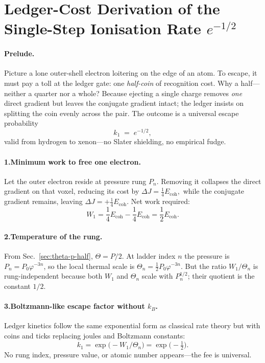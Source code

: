\documentclass[11pt,oneside]{book}
\begin{document}
\section{Ledger-Cost Derivation of the Single-Step Ionisation Rate \texorpdfstring{$e^{-1/2}$}{e^{-1/2}}}
\label{ssec:single-step-rate}

\paragraph*{Prelude.}
Picture a lone outer-shell electron loitering on the edge of an atom.  
To escape, it must pay a toll at the ledger gate: one \emph{half-coin} of recognition cost.  
Why a half—neither a quarter nor a whole?  
Because ejecting a single charge removes \emph{one} direct gradient but leaves the conjugate gradient intact; the ledger insists on splitting the coin evenly across the pair.  
The outcome is a universal escape probability
\[
  k_{1}
  \;=\;
  e^{-1/2},
\]
valid from hydrogen to xenon—no Slater shielding, no empirical fudge.

\paragraph*{1.\;Minimum work to free one electron.}
Let the outer electron reside at pressure rung $P_{n}$.  
Removing it collapses the direct gradient on that voxel, reducing its cost by
\(
  \Delta J = \frac14E_{\text{coh}},
\)
while the conjugate gradient remains, leaving
\(
  \Delta J = +\frac14E_{\text{coh}}.
\)
Net work required:
\[
  W_{1}
  = \frac14E_{\text{coh}} - 
    \frac14E_{\text{coh}}
  = \frac12E_{\text{coh}}.
\]

\paragraph*{2.\;Temperature of the rung.}
From Sec.~\ref{sec:theta-p-half},
\(
  \Theta = P/2.
\)
At ladder index $n$ the pressure is
\(P_{n}=P_{0}\varphi^{-3n}\),  
so the local thermal scale is
\(
  \Theta_{n} = \tfrac12P_{0}\varphi^{-3n}.
\)
But the ratio $W_{1}/\Theta_{n}$ is rung-independent because both $W_{1}$ and $\Theta_{n}$ scale with $P_{n}^{1/2}$; their quotient is the constant $1/2$.

\paragraph*{3.\;Boltzmann-like escape factor without $k_{B}$.}
Ledger kinetics follow the same exponential form as classical rate theory but with coins and ticks replacing joules and Boltzmann constants:
\[
  k_{1}
  = \exp\!\bigl(-W_{1}/\Theta_{n}\bigr)
  = \exp\!\bigl(-\tfrac12\bigr).
\]
No rung index, pressure value, or atomic number appears—the fee is
universal.
\end{document}
